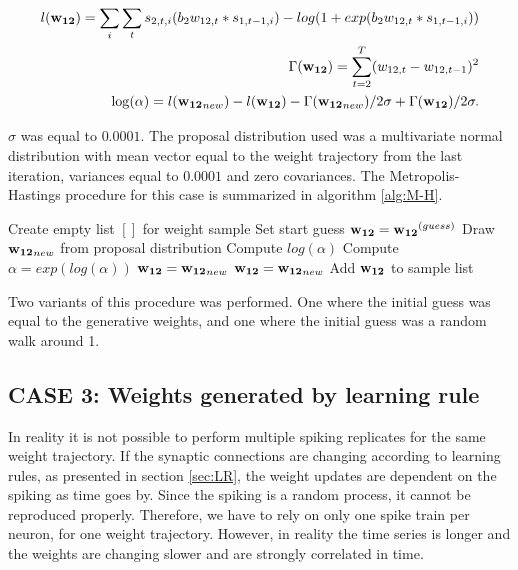 \begin{equation}
\begin{split}
    l({\bf w_{12}}) = \sum_i \sum_t s_{2,t,i}(b_2 w_{12,t}*s_{1,t-1,i}) - log(1 + exp(b_2 w_{12,t} * s_{1,t-1,i})) \\
    \Gamma({\bf w_{12}}) = \sum_{t=2}^T (w_{12,t} - w_ {12,t-1})^2\\
    \log ( \alpha) = l({\bf w_{12}}_{new}) - l({\bf w_{12}}) - \Gamma({\bf w_{12}}_{new})/2\sigma + \Gamma({\bf w_{12}})/2\sigma.
\end{split}
\end{equation}

$\sigma$ was equal to $0.0001$. The proposal distribution used was a multivariate normal distribution with mean vector equal to the weight trajectory from the last iteration, variances equal to $0.0001$ and zero covariances. 
The Metropolis-Hastings procedure for this case is summarized in algorithm \ref{alg:M-H}.

\begin{algorithm}
\caption{}\label{alg:M-H}
\begin{algorithmic}
\State Create empty list $[]$ for weight sample
\State Set start guess ${\bf w_{12}} = {\bf w_{12}}^{(guess)}$
\State Draw ${\bf w_{12}}_{new}$ from proposal distribution
\State Compute $log(\alpha)$
\State Compute $\alpha = exp(log(\alpha))$
\State ${\bf w_{12}} = {\bf w_{12}}_{new}$
\Else 
{}
\State ${\bf w_{12}} = {\bf w_{12}}_{new}$
\EndIf
\EndIf
\State Add ${\bf w_{12}}$ to sample list
\EndFor
\end{algorithmic}
\end{algorithm}

Two variants of this procedure was performed. One where the initial guess was equal to the generative weights, and one where the initial guess was a random walk around 1. 

\subsection{CASE 3: Weights generated by learning rule}
In reality it is not possible to perform multiple spiking replicates for the same weight trajectory. If the synaptic connections are changing according to learning rules, as presented in section \ref{sec:LR}, the weight updates are dependent on the spiking as time goes by. Since the spiking is a random process, it cannot be reproduced properly. Therefore, we have to rely on only one spike train per neuron, for one weight trajectory. However, in reality the time series is longer and the weights are changing slower and are strongly correlated in time. 

